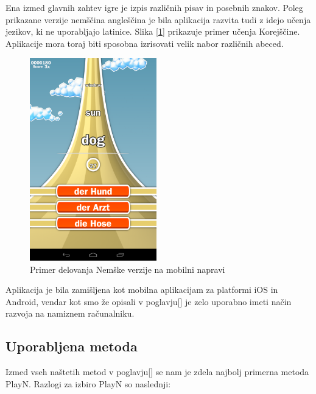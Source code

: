 Ena izmed glavnih zahtev igre je izpis različnih pisav in posebnih znakov. Poleg prikazane verzije nemščina angleščina je bila aplikacija razvita tudi z idejo učenja jezikov, ki ne uporabljajo latinice. Slika [\ref{german}] prikazuje primer učenja Korejščine. Aplikacije mora toraj biti sposobna izrisovati velik nabor različnih abeced.

\begin{figure}
\begin{center}
\includegraphics[width=5.5cm]{pic/defg-german.png}
\end{center}
\caption{Primer delovanja Nemške verzije na mobilni napravi}
\label{german}
\end{figure} 

Aplikacija je bila zamišljena kot mobilna aplikacijam za platformi iOS in Android, vendar kot smo že opisali v poglavju[] je zelo uporabno imeti način razvoja na namiznem računalniku.

\subsection{Uporabljena metoda}

Izmed vseh naštetih metod v poglavju[] se nam je zdela najbolj primerna metoda PlayN. Razlogi za izbiro PlayN so naslednji:

